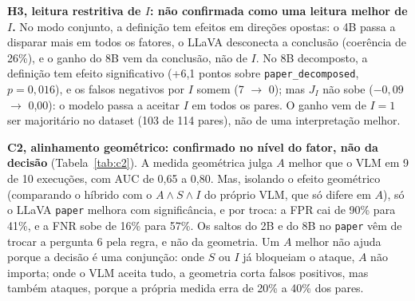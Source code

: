 \documentclass[journal,onecolumn]{IEEEtran}
\begin{document}
\textbf{H3, leitura restritiva de $I$: não confirmada como uma leitura melhor de $I$.} No modo conjunto,
a definição tem efeitos em direções opostas: o 4B passa a disparar mais em todos os fatores, o LLaVA
desconecta a conclusão (coerência de 26\%), e o ganho do 8B vem da conclusão, não de $I$. No 8B
decomposto, a definição tem efeito significativo (+6,1 pontos sobre \texttt{paper\_decomposed},
$p=0{,}016$), e os falsos negativos por $I$ somem (7 $\to$ 0); mas $J_I$ não sobe ($-0{,}09$ $\to$
0,00): o modelo passa a aceitar $I$ em todos os pares. O ganho vem de $I=1$ ser majoritário no
dataset (103 de 114 pares), não de uma interpretação melhor.

\textbf{C2, alinhamento geométrico: confirmado no nível do fator, não da decisão}
(Tabela~\ref{tab:c2}). A medida geométrica julga $A$ melhor que o VLM em 9 de 10 execuções, com AUC de
0,65 a 0,80. Mas, isolando o efeito geométrico (comparando o híbrido com o $A\wedge S\wedge I$ do próprio
VLM, que só difere em $A$), só o LLaVA \texttt{paper} melhora com significância, e por troca: a FPR cai
de 90\% para 41\%, e a FNR sobe de 16\% para 57\%. Os saltos do 2B e do 8B no \texttt{paper} vêm de
trocar a pergunta 6 pela regra, e não da geometria. Um $A$ melhor não ajuda porque a decisão é uma
conjunção: onde $S$ ou $I$ já bloqueiam o ataque, $A$ não importa; onde o VLM aceita tudo, a geometria
corta falsos positivos, mas também ataques, porque a própria medida erra de 20\% a 40\% dos pares.
\end{document}
